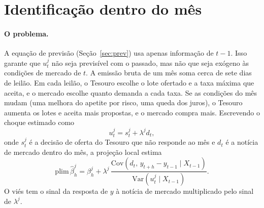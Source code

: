 \documentclass[12pt,a4paper]{article}
\begin{document}
\section{Identificação dentro do mês}\label{sec:ident}

\paragraph{O problema.} A equação de previsão (Seção~\ref{sec:prev}) usa apenas
informação de \(t-1\). Isso garante que \(u_t^j\) não seja previsível com o passado,
mas não que seja exógeno às condições de mercado de \(t\). A emissão bruta de um
mês soma cerca de sete dias de leilão. Em cada leilão, o Tesouro escolhe o lote
ofertado e a taxa máxima que aceita, e o mercado escolhe quanto demanda a cada
taxa. Se as condições do mês mudam (uma melhora do apetite por risco, uma queda dos
juros), o Tesouro aumenta os lotes e aceita mais propostas, e o mercado compra
mais. Escrevendo o choque estimado como
\[
u_t^j=s_t^j+\lambda^j d_t,
\]
onde \(s_t^j\) é a decisão de oferta do Tesouro que não responde ao mês e \(d_t\)
é a notícia de mercado dentro do mês, a projeção local estima
\[
\mathrm{plim}\,\hat\beta_h^j=\beta_h^j+\lambda^j\,
\frac{\mathrm{Cov}(d_t,\,y_{t+h}-y_{t-1}\mid X_{t-1})}{\mathrm{Var}(u_t^j\mid X_{t-1})}.
\]
O viés tem o sinal da resposta de \(y\) à notícia de mercado multiplicado pelo
sinal de \(\lambda^j\).
\end{document}
